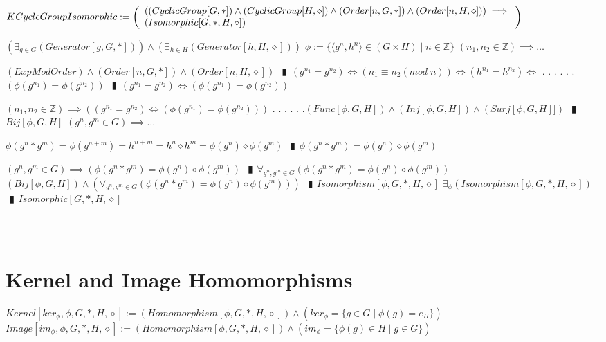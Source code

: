 \documentclass{book}
\newcommand{\abr}{:=}
\newcommand{\cont}{\phantom{.}. . .\phantom{.}}
\newcommand{\pipe}{$\phantom{(}\vrectangleblack\phantom{)}$}
\newcommand{\st}{\mathbin{|}}
\begin{document}
$KCycleGroupIsomorphic \abr \left(\begin{array}{ll}
  ((CyclicGroup[G, *]) \hfill \land \hfill (CyclicGroup[H, \diamond]) \hfill \land \hfill (Order[n, G, *]) \hfill \land \hfill (Order[n, H, \diamond])) \hfill \implies \hfill \\
  (Isomorphic[G, *, H, \diamond])
\end{array}\right)$
\begin{enumerate}
  \lit $(\exists_{g \in G}(Generator[g, G, *])) \land (\exists_{h \in H}(Generator[h, H, \diamond]))$
  \lit $\phi \abr \{\langle g^n, h^n \rangle \in (G \times H) \st n \in \mathbb{Z}\}$
  \lit $(n_1, n_2 \in \mathbb{Z}) \implies \ldots$
  \begin{enumerate}
    \lit $(ExpModOrder) \land (Order[n, G, *]) \land (Order[n, H, \diamond])$ \pipe $(g^{n_1} = g^{n_2}) \iff (n_1 \equiv n_2 (mod \phantom{.} n)) \iff (h^{n_1} = h^{n_2}) \iff$ \cont
    \lit \cont $(\phi(g^{n_1}) = \phi(g^{n_2}))$ \pipe $(g^{n_1} = g^{n_2}) \iff (\phi(g^{n_1}) = \phi(g^{n_2}))$
  \end{enumerate}
  \lit $(n_1, n_2 \in \mathbb{Z}) \implies ((g^{n_1} = g^{n_2}) \iff (\phi(g^{n_1}) = \phi(g^{n_2})))$ \cont
  \lit \cont $(Func[\phi, G, H]) \land (Inj[\phi, G, H]) \land (Surj[\phi, G, H]])$ \pipe $Bij[\phi, G, H]$ %
  \lit $(g^n, g^m \in G) \implies \ldots$
  \begin{enumerate}
    \lit $\phi(g^n * g^m) = \phi(g^{n + m}) = h^{n + m} = h^n \diamond h^m = \phi(g^n) \diamond \phi(g^m)$ \pipe $\phi(g^n * g^m) = \phi(g^n) \diamond \phi(g^m)$
  \end{enumerate}
  \lit $(g^n, g^m \in G) \implies (\phi(g^n * g^m) = \phi(g^n) \diamond \phi(g^m))$ \pipe $\forall_{g^n, g^m \in G}(\phi(g^n * g^m) = \phi(g^n) \diamond \phi(g^m))$
  \lit $(Bij[\phi, G, H]) \land (\forall_{g^n, g^m \in G}(\phi(g^n * g^m) = \phi(g^n) \diamond \phi(g^m)))$ \pipe $Isomorphism[\phi, G, *, H, \diamond]$
  \lit $\exists_{\phi}(Isomorphism[\phi, G, *, H, \diamond])$ \pipe $Isomorphic[G, *, H, \diamond]$
\end{enumerate} \vspace{.75mm} \hrule \vspace{.75mm} \ \\

\section{Kernel and Image Homomorphisms}
$Kernel[ker_\phi, \phi, G, *, H, \diamond] \abr (Homomorphism[\phi, G, *, H, \diamond]) \land (ker_\phi = \{g \in G \st \phi(g) = e_H\})$ \\
$Image[im_\phi, \phi, G, *, H, \diamond] \abr (Homomorphism[\phi, G, *, H, \diamond]) \land (im_\phi = \{\phi(g) \in H \st g \in G\})$ \\
\end{document}
